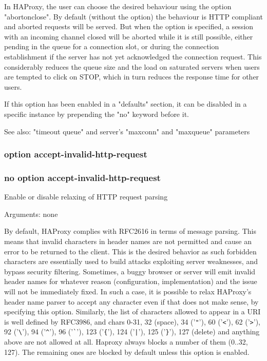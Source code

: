   In HAProxy, the user can choose the desired behaviour using the option
  "abortonclose". By default (without the option) the behaviour is HTTP
  compliant and aborted requests will be served. But when the option is
  specified, a session with an incoming channel closed will be aborted while
  it is still possible, either pending in the queue for a connection slot, or
  during the connection establishment if the server has not yet acknowledged
  the connection request. This considerably reduces the queue size and the load
  on saturated servers when users are tempted to click on STOP, which in turn
  reduces the response time for other users.

  If this option has been enabled in a "defaults" section, it can be disabled
  in a specific instance by prepending the "no" keyword before it.

  See also: "timeout queue" and server's "maxconn" and "maxqueue" parameters

\subsubsection{option accept-invalid-http-request}
\subsubsection{no option accept-invalid-http-request}
  Enable or disable relaxing of HTTP request parsing


  Arguments: none

  By default, HAProxy complies with RFC2616 in terms of message parsing. This
  means that invalid characters in header names are not permitted and cause an
  error to be returned to the client. This is the desired behavior as such
  forbidden characters are essentially used to build attacks exploiting server
  weaknesses, and bypass security filtering. Sometimes, a buggy browser or
  server will emit invalid header names for whatever reason (configuration,
  implementation) and the issue will not be immediately fixed. In such a case,
  it is possible to relax HAProxy's header name parser to accept any character
  even if that does not make sense, by specifying this option. Similarly, the
  list of characters allowed to appear in a URI is well defined by RFC3986, and
  chars 0-31, 32 (space), 34 ('\verb|"|'), 60 ('\verb|<|'), 62 ('\verb|>|'), 92 ('\verb|\|'), 94 ('\verb|^|'), 96
  ('\verb|`|'), 123 ('\verb|{|'), 124 ('\verb:|:'), 125 ('\verb|}|'), 127 (delete) and anything above are
  not allowed at all. Haproxy always blocks a number of them (0..32, 127). The
  remaining ones are blocked by default unless this option is enabled.


